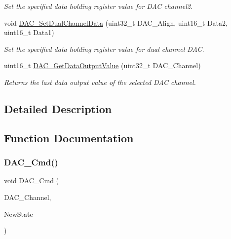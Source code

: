 \begin{DoxyCompactItemize}
\begin{DoxyCompactList}\small\item\em Set the specified data holding register value for D\+AC channel2. \end{DoxyCompactList}\item 
void \hyperlink{group___d_a_c___exported___functions_ga4ca2cfdf56ab35a23f2517f23d7fbb24}{D\+A\+C\+\_\+\+Set\+Dual\+Channel\+Data} (uint32\+\_\+t D\+A\+C\+\_\+\+Align, uint16\+\_\+t Data2, uint16\+\_\+t Data1)
\begin{DoxyCompactList}\small\item\em Set the specified data holding register value for dual channel D\+AC. \end{DoxyCompactList}\item 
uint16\+\_\+t \hyperlink{group___d_a_c___exported___functions_ga51274838de1e5dd012a82d7f44d7a50b}{D\+A\+C\+\_\+\+Get\+Data\+Output\+Value} (uint32\+\_\+t D\+A\+C\+\_\+\+Channel)
\begin{DoxyCompactList}\small\item\em Returns the last data output value of the selected D\+AC channel. \end{DoxyCompactList}\end{DoxyCompactItemize}


\subsection{Detailed Description}


\subsection{Function Documentation}
\mbox{\label{group___d_a_c___exported___functions_ga323e61530d7fa9396c3bce9edb61f733}} 
\subsubsection{\texorpdfstring{D\+A\+C\+\_\+\+Cmd()}{DAC\_Cmd()}}
{\footnotesize\ttfamily void D\+A\+C\+\_\+\+Cmd (\begin{DoxyParamCaption}\item[{uint32\+\_\+t}]{D\+A\+C\+\_\+\+Channel,  }\item[{\hyperlink{group___exported__types_gac9a7e9a35d2513ec15c3b537aaa4fba1}{Functional\+State}}]{New\+State }\end{DoxyParamCaption})}



